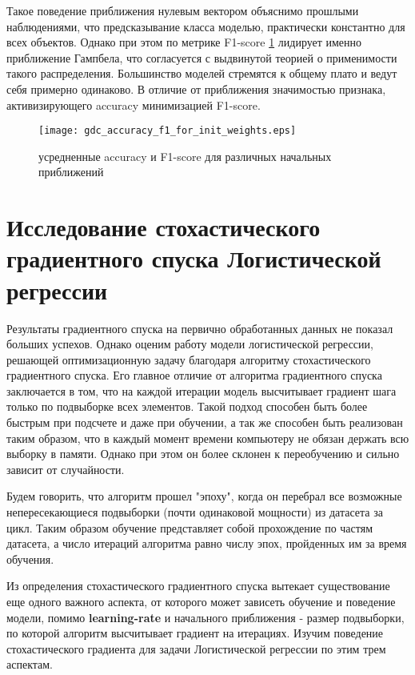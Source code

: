 \documentclass{article}
\begin{document}
        Такое поведение приближения нулевым вектором объяснимо прошлыми наблюдениями, что предсказывание класса моделью, практически константно для всех объектов. Однако при этом по метрике F1-score \ref{fig:gdc_accuracy_f1_for_init_weights} лидирует именно приближение Гампбела, что согласуется с выдвинутой теорией о применимости такого распределения. Большинство моделей стремятся к общему плато и ведут себя примерно одинаково. В отличие от приближения значимостью признака, активизирующего accuracy минимизацией F1-score. 
            

    \begin{figure}[t]
        \centering
        \texttt{[image: gdc\_accuracy\_f1\_for\_init\_weights.eps]}
        \caption{усредненные accuracy и F1-score для различных начальных приближений}
        \label{fig:gdc_accuracy_f1_for_init_weights}
    \end{figure}

\section{Исследование стохастического градиентного спуска Логистической регрессии}

    Результаты градиентного спуска на первично обработанных данных не показал больших успехов. Однако оценим работу модели логистической регрессии, решающей оптимизационную задачу благодаря алгоритму стохастического градиентного спуска. Его главное отличие от алгоритма градиентного спуска заключается в том, что на каждой итерации модель высчитывает градиент шага только по подвыборке всех элементов. Такой подход способен быть более быстрым при подсчете и даже при обучении, а так же способен быть реализован таким образом, что в каждый момент времени компьютеру не обязан держать всю выборку в памяти. Однако при этом он более склонен к переобучению и сильно зависит от случайности.

    Будем говорить, что алгоритм прошел "эпоху", когда он перебрал все возможные непересекающиеся подвыборки (почти одинаковой мощности) из датасета за цикл. Таким образом обучение представляет собой прохождение по частям датасета, а число итераций алгоритма равно числу эпох, пройденных им за время обучения.

    Из определения стохастического градиентного спуска вытекает существование еще одного важного аспекта, от которого может зависеть обучение и поведение модели, помимо \textbf{learning-rate} и начального приближения - размер подвыборки, по которой алгоритм высчитывает градиент на итерациях. Изучим поведение стохастического градиента для задачи Логистической регрессии по этим трем аспектам.
\end{document}
